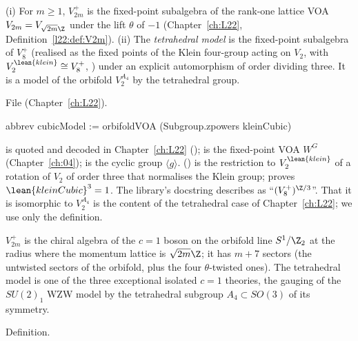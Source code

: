 \begin{definition}\label{l15:def:orbifolds}
(i) For $m\ge1$, $V_{2m}^+$ is the fixed-point subalgebra of the rank-one lattice VOA $V_{2m}=V_{\sqrt{2m}\Z}$ under the lift
$\theta$ of $-1$ (Chapter~\ref{ch:L22}, Definition~\ref{l22:def:V2m}). (ii) The \emph{tetrahedral model} is the fixed-point
subalgebra of $V_8^+$ (realised as the fixed points of the Klein four-group  acting on $V_2$, with
$V_2^{\lean{klein}}\cong V_8^+$, ) under an explicit automorphism  of order
dividing three. It is a model of the orbifold $V_2^{A_4}$ by the tetrahedral group.
\end{definition}
\noindent File  (Chapter~\ref{ch:L22}).
\begin{leancode}
abbrev cubicModel := orbifoldVOA (Subgroup.zpowers kleinCubic)
\end{leancode}

\begin{dictionary}
 is quoted and decoded in Chapter~\ref{ch:L22} ();
 is the fixed-point VOA $W^G$ (Chapter~\ref{ch:04});  is the cyclic group
$\langle g\rangle$.  () is the restriction to
$V_2^{\lean{klein}}$ of a rotation of $V_2$ of order three that normalises the Klein group;  proves
$\lean{kleinCubic}^3=1$. The library's docstring describes  as ``$(V_8^+)^{\Z/3}$''. That it is isomorphic
to $V_2^{A_4}$ is the content of the tetrahedral case of Chapter~\ref{ch:L22}; we use only the definition.
\end{dictionary}

\begin{physics}
$V_{2m}^+$ is the chiral algebra of the $c=1$ boson on the orbifold line $S^1/\Z_2$ at the radius where the momentum lattice is
$\sqrt{2m}\Z$; it has $m+7$ sectors (the untwisted sectors of the orbifold, plus the four $\theta$-twisted ones). The tetrahedral
model is one of the three exceptional isolated $c=1$ theories, the gauging of the $SU(2)_1$ WZW model by the tetrahedral
subgroup $A_4\subset SO(3)$ of its symmetry.
\end{physics}

\begin{status}
Definition.
\end{status}

